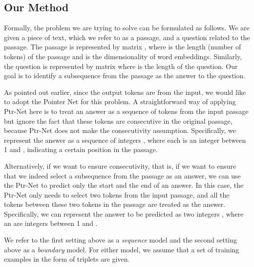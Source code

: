 \documentclass{article} \usepackage{iclr2017_conference,times}
\def\ignore#1{}
\begin{document}
\subsection{Our Method}

Formally, the problem we are trying to solve can be formulated as follows.
We are given a piece of text, which we refer to as a passage, and a question related to the passage.
The passage is represented by matrix , where  is the length (number of tokens) of the passage and  is the dimensionality of word embeddings.
Similarly, the question is represented by matrix  where  is the length of the question.
Our goal is to identify a subsequence from the passage as the answer to the question.

As pointed out earlier, since the output tokens are from the input, we would like to adopt the Pointer Net for this problem.
A straightforward way of applying Ptr-Net here is to treat an answer as a sequence of tokens from the input passage but ignore the fact that these tokens are consecutive in the original passage, because Ptr-Net does not make the consecutivity assumption.
Specifically, we represent the answer as a sequence of integers , where each  is an integer between 1 and , indicating a certain position in the passage.

Alternatively, if we want to ensure consecutivity, that is, if we want to ensure that we indeed select a subsequence from the passage as an answer, we can use the Ptr-Net to predict only the start and the end of an answer.
In this case, the Ptr-Net only needs to select two tokens from the input passage, and all the tokens between these two tokens in the passage are treated as the answer.
Specifically, we can represent the answer to be predicted as two integers , where  an  are integers between 1 and .

We refer to the first setting above as a \emph{sequence} model and the second setting above as a \emph{boundary} model.
For either model, we assume that a set of training examples in the form of triplets  are given.

\ignore{
Normally we could uniquely represent a subsequence by the positions of the start and the end of the subsequence in the original sequence.
In this paper, however, because we want to directly apply Pointer Net, we assume a relaxed setting in which we take tokens not necessarily consecutive in the given passage to form an answer.
We thus represent the answer as a sequence of integers , where each  is an integer between 1 and , indicating a certain position in the passage.
We assume that a set of training examples in the form of triplets  are given.
}
\end{document}

